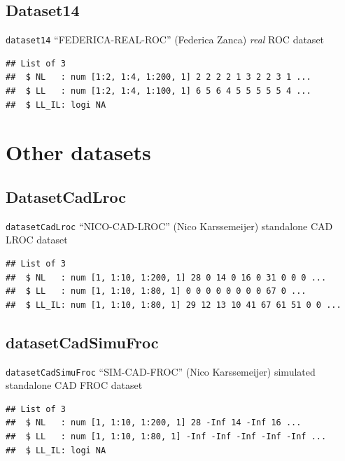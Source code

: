 \documentclass[
]{book}
\begin{document}
\hypertarget{datasets-dataset14}{%
\subsection{Dataset14}\label{datasets-dataset14}}

\texttt{dataset14} ``FEDERICA-REAL-ROC'' (Federica Zanca) \emph{real} ROC dataset \citep{zanca2012correlation}

\begin{verbatim}
## List of 3
##  $ NL   : num [1:2, 1:4, 1:200, 1] 2 2 2 2 1 3 2 2 3 1 ...
##  $ LL   : num [1:2, 1:4, 1:100, 1] 6 5 6 4 5 5 5 5 5 4 ...
##  $ LL_IL: logi NA
\end{verbatim}

\hypertarget{other-datasets}{%
\section{Other datasets}\label{other-datasets}}

\hypertarget{datasets-datasetCadLroc}{%
\subsection{DatasetCadLroc}\label{datasets-datasetCadLroc}}

\texttt{datasetCadLroc} ``NICO-CAD-LROC'' (Nico Karssemeijer) standalone CAD LROC dataset

\begin{verbatim}
## List of 3
##  $ NL   : num [1, 1:10, 1:200, 1] 28 0 14 0 16 0 31 0 0 0 ...
##  $ LL   : num [1, 1:10, 1:80, 1] 0 0 0 0 0 0 0 0 67 0 ...
##  $ LL_IL: num [1, 1:10, 1:80, 1] 29 12 13 10 41 67 61 51 0 0 ...
\end{verbatim}

\hypertarget{datasets-datasetCadSimuFroc}{%
\subsection{datasetCadSimuFroc}\label{datasets-datasetCadSimuFroc}}

\texttt{datasetCadSimuFroc} ``SIM-CAD-FROC'' (Nico Karssemeijer) simulated standalone CAD FROC dataset

\begin{verbatim}
## List of 3
##  $ NL   : num [1, 1:10, 1:200, 1] 28 -Inf 14 -Inf 16 ...
##  $ LL   : num [1, 1:10, 1:80, 1] -Inf -Inf -Inf -Inf -Inf ...
##  $ LL_IL: logi NA
\end{verbatim}

  
\end{document}

